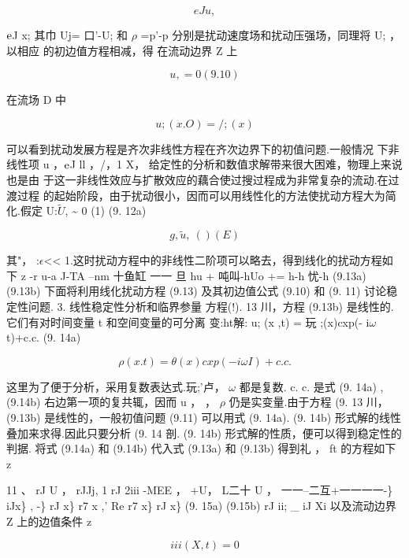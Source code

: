 \begin{equation*}eJ u,\tag{9.9b}\end{equation*}

${\rm e}$J x; 其巾 Uj= 口'-U; 和 $\rho$ =p'-p 分别是扰动速度场和扰动压强场，同理将 U; ， 以相应 的初边值方程相减，得 在流动边界 Z 上

\[u, = 0 (9. 10)\]

在流场 D 中

\begin{equation*}u;(x.O) = /;(x)\tag{9.11}\end{equation*}

可以看到扰动发展方程是齐次非线性方程在齐次边界下的初值问题.一般情况 下非线性项 u ，${\rm e}$J ll ，/，1 X， 给定性的分析和数值求解带来很大困难，物理上来说也是由 于这一非线性效应与扩散效应的藕合使过搜过程成为非常复杂的流动.在过渡过程 的起始阶段，由于扰动很小，因而可以用线性化的方法使扰动方程大为简化.假定 U:$\tilde{U}$, \textasciitilde{} 0 (1) (9. 12a)

\begin{equation*}g , \tilde{u}, ~ ()(E)\tag{9.12b}\end{equation*}

其"， :$\epsilon$<< 1.这时扰动方程中的非线性二阶项可以略去，得到线化的扰动方程如下 z -r u-a J-TA --nm 十鱼缸 一一 旦 hu + 吨叫-hUo += h-h 忧-h (9.13a) (9.13b) 下面将利用线化扰动方程 (9.13) 及其初边值公式 (9.10) 和 (9. 11) 讨论稳定性问题. 3. 线性稳定性分析和临界参量 方程(!). 13 川，方程 (9.13b) 是线性的.它们有对时间变量 t 和空间变量的可分离 变:ht解: u; (x ,t) = 玩 ;(x)cxp(- i$\omega$ t)+c.c. (9. 14a)

\begin{equation*}\rho  (x.t) = \theta (x)cxp(- i\omega  I)+c.c.\tag{9.14b}\end{equation*}

这里为了便于分析，采用复数表达式.玩;'卢， $\omega$ 都是复数. c. c. 是式 (9. 14a) , (9.14b) 右边第一项的复共辄，因而 u ， ， $\rho$ 仍是实变量.由于方程 (9. 13 川， (9.13b) 是线性的，一般初值问题 (9.11) 可以用式 (9. 14a). (9. 14b) 形式解的线性 叠加来求得.因此只要分析 (9. 14 剖. (9. 14b) 形式解的性质，便可以得到稳定性的 判据. 将式 (9.14a) 和 (9.14b) 代入式 (9.13a) 和 (9.13b) 得到礼 ， ft 的方程如下 z

11 、 rJ U ， rJJj, 1 rJ 2iii -MEE ， +U， L二十 U ， 一一--二互+一一一一-\} iJx\} , -\} rJ x\} r7 x ,' Re r7 x\} rJ x\} (9. 15a) (9.15b) rJ ii; \_ iJ Xi 以及流动边界 Z 上的边值条件 z

\begin{equation*}iii(X ,t) = 0\tag{9.16}\end{equation*}

